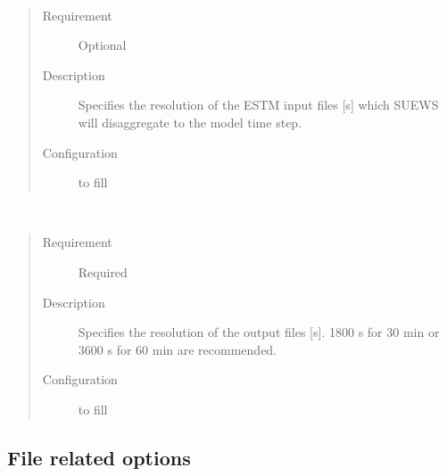\documentclass[letterpaper,10pt,english]{sphinxmanual}
\begin{document}

\begin{fulllineitems}
\label{\detokenize{input_files/RunControl/Time_related_options:cmdoption-arg-resolutionfilesinestm}}~\begin{quote}\begin{description}
\item[{Requirement}] \leavevmode
Optional

\item[{Description}] \leavevmode
Specifies the resolution of the ESTM input files {[}s{]} which SUEWS will disaggregate to the model time step.

\item[{Configuration}] \leavevmode
to fill

\end{description}\end{quote}

\end{fulllineitems}


\begin{fulllineitems}
\label{\detokenize{input_files/RunControl/Time_related_options:cmdoption-arg-resolutionfilesout}}~\begin{quote}\begin{description}
\item[{Requirement}] \leavevmode
Required

\item[{Description}] \leavevmode
Specifies the resolution of the output files {[}s{]}. 1800 s for 30 min or 3600 s for 60 min are recommended.

\item[{Configuration}] \leavevmode
to fill

\end{description}\end{quote}

\end{fulllineitems}



\subsection{File related options}
\label{\detokenize{input_files/RunControl/File_related_options:file-related-options}}\label{\detokenize{input_files/RunControl/File_related_options::doc}}\label{\detokenize{input_files/RunControl/File_related_options:id1}}
\end{document}
